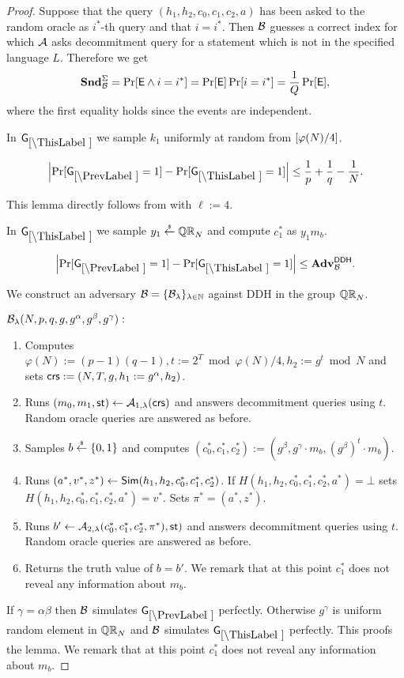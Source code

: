 \begin{proof}
Suppose that the query $(h_1, h_2,c_0,c_1,c_2,a)$ has been asked to the random oracle as $i^*$-th query and that $i=i^*$. Then $\mathcal{B}$ guesses a correct index for which $\mathcal{A}$ asks decommitment query for a statement which is not in the specified language $L$. Therefore we get
\[\mathbf{Snd}^\Sigma_{\mathcal{B}} = \Pr[\mathsf{E} \land i=i^*] = \Pr[\mathsf{E}]\Pr[i=i^*] = \frac{1}{Q}\Pr[\mathsf{E}],\]
where the first equality holds since the events are independent.


In $\games_\thisgame$ we sample $k_1$ uniformly at random from $[\varphi(N)/4]$.

\begin{lemma}
\[
\left|\Pr[\games_\prevgame = 1] - \Pr[\games_\thisgame = 1]\right| \leq \frac{1}{p}+\frac{1}{q}-\frac{1}{N}.
\]
\end{lemma}

This lemma directly follows from  with $\ell:=4$.

In $\games_\thisgame$ we sample $y_1 \stackrel{{\scriptscriptstyle\$}}{\leftarrow} \mathbb{QR}_N$ and compute $c_1^*$ as  $y_1 m_b$. 

\begin{lemma}
\[
\left|\Pr[\games_\prevgame = 1] - \Pr[\games_\thisgame = 1]\right| \leq \advtg_\advB^\ddh.
\]
\end{lemma}
We construct an adversary $\mathcal{B} = \{\mathcal{B}_{\lambda}\}_{\lambda \in \mathbb{N}}$ against DDH in the group $\mathbb{QR}_N$. %

$\mathcal{B}_{\lambda}(N,p,q,g,g^\alpha, g^\beta, g^\gamma):$
\vspace{-2mm}
\begin{enumerate}
\item Computes $\varphi(N):=(p-1)(q-1), t:=2^{T} \bmod \varphi(N)/4, h_2:=g^t \bmod N$ and sets $\mathsf{crs}:=(N, T, g, h_1: = g^\alpha, h_2)$.
\item Runs $(m_0, m_1, \mathsf{st}) \leftarrow \mathcal{A}_{1, \lambda}(\mathsf{crs})$ and answers decommitment queries using $t$. Random oracle queries are answered as before.
\item Samples $b \stackrel{{\scriptscriptstyle\$}}{\leftarrow} \{0,1\}$ and computes $(c_0^*, c_1^*, c_2^*):=(g^\beta, g^\gamma \cdot m_b, (g^\beta)^t \cdot m_b).$ 
\item Runs $(a^*,v^*,z^*) \leftarrow \mathsf{Sim}(h_1, h_2, c_0^*, c_1^*, c_2^*)$. If $H(h_1, h_2, c_0^*, c_1^*, c_2^*,a^*) = \bot$ sets $H(h_1, h_2, c_0^*, c_1^*, c_2^*,a^*) = v^*$. Sets $\pi^* = (a^*,z^*)$.
\item Runs $b' \leftarrow \mathcal{A}_{2, \lambda}(c_0^*, c_1^*, c_2^*, \pi^*), \mathsf{st})$ and answers decommitment queries using $t$. Random oracle queries are answered as before.
\item Returns the truth value of $b=b'$. We remark that at this point $c_1^*$ does not reveal any information about $m_b$.
\end{enumerate}
If $\gamma = \alpha\beta$ then $\mathcal{B}$ simulates $\games_\prevgame$ perfectly. Otherwise $g^\gamma$ is uniform random element in $\mathbb{QR}_N$ and $\mathcal{B}$ simulates $\games_\thisgame$ perfectly. This proofs the lemma. We remark that at this point $c_1^*$ does not reveal any information about $m_b$.



\end{proof}
